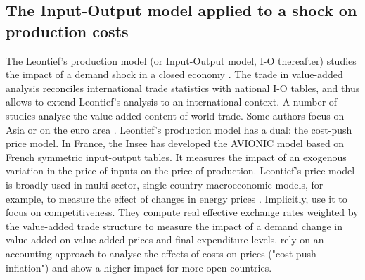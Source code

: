 \documentclass[12pt,a4paper]{paper}
\begin{document}
\subsection{The Input-Output model applied to a shock on production costs} 
\label{subsec:io}
The Leontief's production model (or Input-Output model, I-O thereafter) studies the impact of a demand shock in a closed economy \citep{Leontief1951}. 
The trade in value-added analysis reconciles international trade statistics with national I-O tables, and thus allows to extend Leontief's analysis to an international context.
A number of studies \citep{Hummels2001,Daudin2006,Daudin2011, DeBacker2012,Johnson2012,Koopman2014, Amador2015,Los2016,Miroudot2020} analyse the value added content of world trade. Some authors focus on Asia \citep{Sato2014} or on the euro area \citep{Cappariello2015}.
Leontief's production model has a dual: the cost-push price model.
In France, the Insee \citep{Bourgeois2019} has developed the AVIONIC model based on French symmetric input-output tables. 
It measures the impact of an exogenous variation in the price of inputs on the price of production.
Leontief's price model is broadly used in multi-sector, single-country macroeconomic models, for example, to measure the effect of changes in energy prices \citep{Bournay2015, Sharify2013}. Implicitly, \cite{Bems2015} use it to focus on competitiveness. 
They compute real effective exchange rates weighted by the value-added trade structure to measure the impact of a demand change in value added on value added prices and final expenditure levels. %
\cite{Cochard2016} rely on an accounting approach to analyse the effects of costs on prices ("cost-push inflation") and show a higher impact for more open countries.
\end{document}
